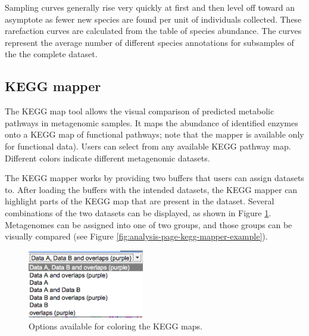 \documentclass[12pt,fullpage]{report}
\begin{document}
Sampling curves generally rise very quickly at first and then level off toward an asymptote as fewer new species are found per unit of individuals collected. These rarefaction curves are calculated from the table of species abundance. The curves represent the average number of different species annotations for subsamples of the the complete dataset.



\subsection*{KEGG mapper}
\label{section:kegg-mapper}

The KEGG map tool allows the visual comparison of predicted metabolic pathways in metagenomic samples.
It maps the abundance of identified enzymes onto a KEGG \cite{KEGG} map of functional pathways; note that the mapper is available only for functional data).
Users can select from any available KEGG pathway map.
Different colors indicate different metagenomic datasets.

The KEGG mapper works by providing two buffers that users can assign datasets to.
After loading the buffers with the intended datasets, the KEGG mapper can highlight parts of the KEGG map that are present in the dataset.
Several combinations of the two datasets can be displayed, as shown in Figure \ref{fig:analysis-page-kegg-mapper-options}.
Metagenomes can be assigned into one of two groups, and those groups can be visually compared
(see Figure \ref{fig:analysis-page-kegg-mapper-example}).

\begin{figure}
\begin{center}
\includegraphics[width=2in]{Images/analysis-page-kegg-mapper-options.png}
\end{center}
\caption{Options available for coloring the KEGG maps.}
\label{fig:analysis-page-kegg-mapper-options}
\end{figure}
\end{document}
